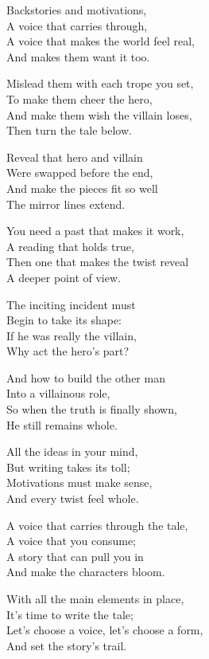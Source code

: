 \begin{lyrics}
Backstories and motivations,\\
A voice that carries through,\\
A voice that makes the world feel real,\\
And makes them want it too.

Mislead them with each trope you set,\\
To make them cheer the hero,\\
And make them wish the villain loses,\\
Then turn the tale below.

Reveal that hero and villain\\
Were swapped before the end,\\
And make the pieces fit so well\\
The mirror lines extend.

You need a past that makes it work,\\
A reading that holds true,\\
Then one that makes the twist reveal\\
A deeper point of view.

The inciting incident must\\
Begin to take its shape:\\
If he was really the villain,\\
Why act the hero's part?

And how to build the other man\\
Into a villainous role,\\
So when the truth is finally shown,\\
He still remains whole.

All the ideas in your mind,\\
But writing takes its toll;\\
Motivations must make sense,\\
And every twist feel whole.

A voice that carries through the tale,\\
A voice that you consume;\\
A story that can pull you in\\
And make the characters bloom.

With all the main elements in place,\\
It's time to write the tale;\\
Let's choose a voice, let's choose a form,\\
And set the story's trail.


\end{lyrics}
